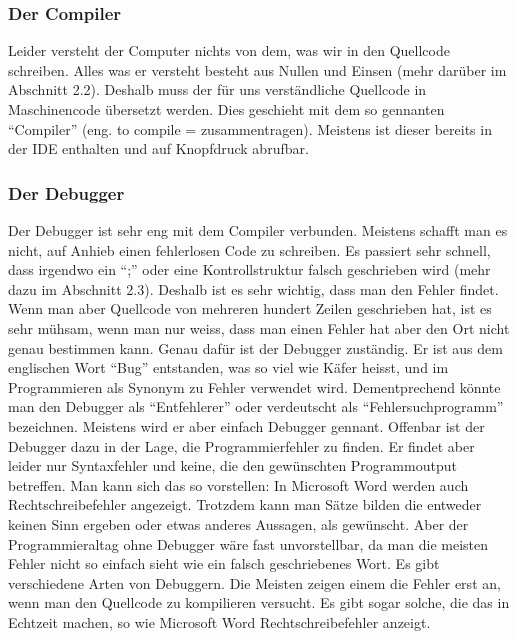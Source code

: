\subsubsection{Der Compiler}
Leider versteht der Computer nichts von dem, was wir in den Quellcode schreiben. Alles was er versteht besteht aus Nullen und Einsen (mehr darüber im Abschnitt 2.2). Deshalb muss der für uns verständliche Quellcode in Maschinencode übersetzt werden. Dies geschieht mit dem so gennanten "`Compiler"' (eng. to compile = zusammentragen). Meistens ist dieser bereits in der IDE enthalten und auf Knopfdruck abrufbar. 

\subsubsection{Der Debugger}
Der Debugger ist sehr eng mit dem Compiler verbunden. Meistens schafft man es nicht, auf Anhieb einen fehlerlosen Code zu schreiben. Es passiert sehr schnell, dass irgendwo ein "`;"' oder eine Kontrollstruktur falsch geschrieben wird (mehr dazu im Abschnitt 2.3). Deshalb ist es sehr wichtig, dass man den Fehler findet. Wenn man aber Quellcode von mehreren hundert Zeilen geschrieben hat, ist es sehr mühsam, wenn man nur weiss, dass man einen Fehler hat aber den Ort nicht genau bestimmen kann. Genau dafür ist der Debugger zuständig. Er ist aus dem englischen Wort "`Bug"' entstanden, was so viel wie Käfer heisst, und im Programmieren als Synonym zu Fehler verwendet wird. Dementprechend könnte man den Debugger als "`Entfehlerer"' oder verdeutscht als "`Fehlersuchprogramm"' bezeichnen. Meistens wird er aber einfach Debugger gennant. Offenbar ist der Debugger dazu in der Lage, die Programmierfehler zu finden. Er findet aber leider nur Syntaxfehler und keine, die den gewünschten Programmoutput betreffen. Man kann sich das so vorstellen: In Microsoft Word werden auch Rechtschreibefehler angezeigt. Trotzdem kann man Sätze bilden die entweder keinen Sinn ergeben oder etwas anderes Aussagen, als gewünscht. Aber der Programmieraltag ohne Debugger wäre fast unvorstellbar, da man die meisten Fehler nicht so einfach sieht wie ein falsch geschriebenes Wort. Es gibt verschiedene Arten von Debuggern. Die Meisten zeigen einem die Fehler erst an, wenn man den Quellcode zu kompilieren versucht. Es gibt sogar solche, die das in Echtzeit machen, so wie Microsoft Word Rechtschreibefehler anzeigt. 

